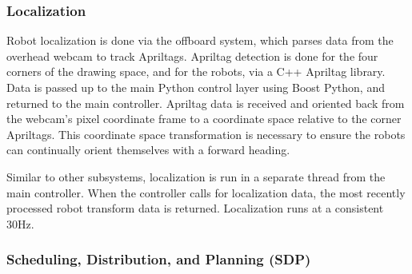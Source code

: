 \subsubsection{Localization}
\label{sec:sw_localization}
Robot localization is done via the offboard system, which parses data from the overhead webcam to track Apriltags. Apriltag detection is done for the four corners of the drawing space, and for the robots, via a C++ Apriltag library. Data is passed up to the main Python control layer using Boost Python, and returned to the main controller. Apriltag data is received and oriented back from the webcam's pixel coordinate frame to a coordinate space relative to the corner Apriltags. This coordinate space transformation is necessary to ensure the robots can continually orient themselves with a forward heading.

Similar to other subsystems, localization is run in a separate thread from the main controller. When the controller calls for localization data, the most recently processed robot transform data is returned. Localization runs at a consistent 30Hz.

\subsubsection{Scheduling, Distribution, and Planning (SDP)}
\label{sec:sw_sdp}


